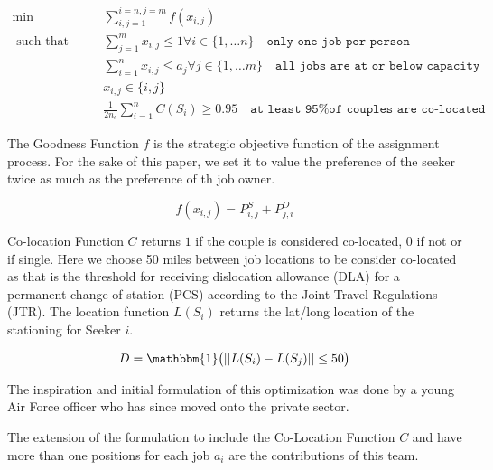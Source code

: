 \begin{align}
\min \qquad & \sum_{i,j = 1}^{i=n, j=m}f(x_{i,j}) \\
\text{ such that } \qquad & \sum_{j=1}^m x_{i,j} \leq 1  \forall i \in \{1, \dots n\} \quad \texttt{only one job per person} \\
& \sum_{i=1}^n x_{i,j} \leq a_j  \forall j \in \{1, \dots m\} \quad \texttt{all jobs are at or below capacity} \\
& x_{i,j} \in \{i,j\} \\
& \frac{1}{2n_c} \sum_{i=1}^n C(S_i) \geq 0.95 \quad \texttt{at least 95\% of couples are co-located}
\end{align}

The Goodness Function $f$ is the strategic objective function of the assignment process. For the sake of this paper, we set it to value the preference of the seeker twice as much as the preference of th job owner.

\[f(x_{i,j}) = P^S_{i,j} + P^O_{j,i}\]

Co-location Function $C$ returns $1$ if the couple is considered co-located, 0 if not or if single. Here we choose 50 miles between job locations to be consider co-located as that is the threshold for receiving dislocation allowance (DLA) for a permanent change of station (PCS) according to the Joint Travel Regulations (JTR). The location function $L(S_i)$ returns the lat/long location of the stationing for Seeker $i$. 

\[D = \mathbbm{1}\big( || L(S_i) - L(S_j) || \leq 50 \big)\]


The inspiration and initial formulation of this optimization was done by a young Air Force officer who has since moved onto the private sector. 

The extension of the formulation to include the Co-Location Function $C$ and have more than one positions for each job $a_i$ are the contributions of this team. 